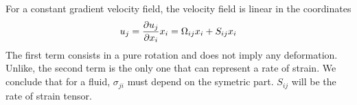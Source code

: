 		For a constant gradient velocity field, the velocity field is linear in the coordinates
		\begin{equation}
			u_j = \frac{\D u_j}{\D x_i}x_i = \Omega _{ij} x_i + S _{ij} x_i
		\end{equation}
		The first term consists in a pure rotation and does not imply any deformation. Unlike, the second term is the only one that can represent a rate of strain. We conclude that for a fluid, $\sigma _{ji}$ must depend on the symetric part. $S_{ij}$ will be the rate of strain tensor. 